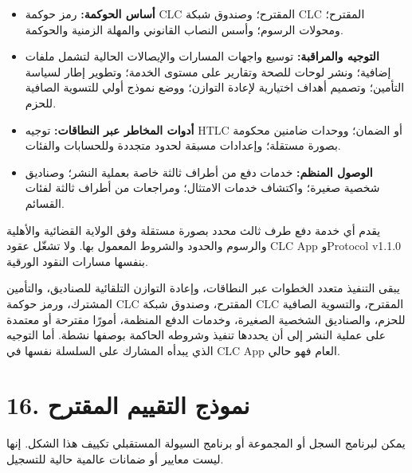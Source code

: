 \documentclass[11pt]{article}
\begin{document}
\begin{itemize}[leftmargin=*]
\item \textbf{أساس الحوكمة:} رمز حوكمة CLC المقترح؛ وصندوق شبكة CLC المقترح؛ ومحولات الرسوم؛ وأسس النصاب القانوني والمهلة الزمنية والحوكمة.
\item \textbf{التوجيه والمراقبة:} توسيع واجهات المسارات والإيصالات الحالية لتشمل ملفات إضافية؛ ونشر لوحات للصحة وتقارير على مستوى الخدمة؛ وتطوير إطار لسياسة التأمين؛ وتصميم أهداف اختيارية لإعادة التوازن؛ ووضع نموذج أولي للتسوية الصافية للحزم.
\item \textbf{أدوات المخاطر عبر النطاقات:} توجيه HTLC أو الضمان؛ ووحدات ضامنين محكومة بصورة مستقلة؛ وإعدادات مسبقة لحدود متجددة وللحسابات والفئات.
\item \textbf{الوصول المنظم:} خدمات دفع من أطراف ثالثة خاصة بعملية النشر؛ وصناديق شخصية صغيرة؛ واكتشاف خدمات الامتثال؛ ومراجعات من أطراف ثالثة لفئات القسائم.
\end{itemize}
يقدم أي خدمة دفع طرف ثالث محدد بصورة مستقلة وفق الولاية القضائية والأهلية والرسوم والحدود والشروط المعمول بها. ولا تشغّل عقود CLC App وProtocol v1.1.0 بنفسها مسارات النقود الورقية.

يبقى التنفيذ متعدد الخطوات عبر النطاقات، وإعادة التوازن التلقائية للصناديق، والتأمين المشترك، ورمز حوكمة CLC المقترح، وصندوق شبكة CLC المقترح، والتسوية الصافية للحزم، والصناديق الشخصية الصغيرة، وخدمات الدفع المنظمة، أمورًا مقترحة أو معتمدة على عملية النشر إلى أن يحددها تنفيذ وشروطه الحاكمة بوصفها نشطة. أما التوجيه الذي يبدأه المشارك على السلسلة نفسها في CLC App العام فهو حالي.


\section*{16. نموذج التقييم المقترح}

يمكن لبرنامج السجل أو المجموعة أو برنامج السيولة المستقبلي تكييف هذا الشكل. إنها ليست معايير أو ضمانات عالمية حالية للتسجيل.
\end{document}
